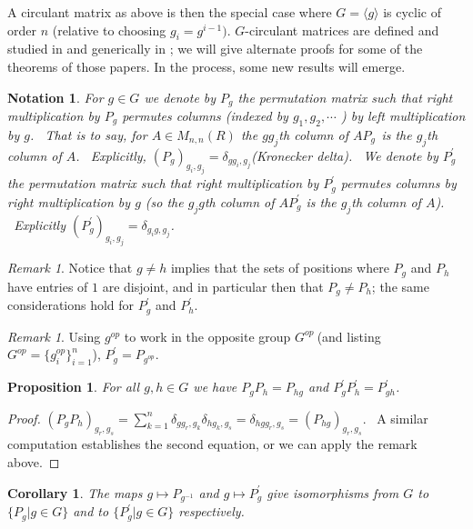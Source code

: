 \documentclass[12pt, a4paper]{amsart}
\numberwithin{equation}{section} %
\theoremstyle{plain}
\theoremstyle{definition}
\theoremstyle{plain}
\newtheorem{prop}[thm]{Proposition}
\newtheorem*{notation}{Notation}
\newtheorem{cor}[thm]{Corollary}
\theoremstyle{remark}
\newtheorem{rem}[thm]{Remark}
\begin{document}
A circulant matrix as above is then the special case where  $G= \langle g \rangle$ is cyclic of order $n$ (relative to choosing $g_{i}=g^{i-1})$.  $G$-circulant
matrices are defined and studied in \cite{hurley2006} and generically in \cite{kanemitsu2013matrices}; we will give alternate proofs for some of the theorems of those papers. In the process, some new results will emerge.

\begin{notation}
For $g\in G$ we denote by $P_{g}$ the permutation matrix such that right
multiplication by $P_{g}$ permutes columns (indexed by $g_{1},g_{2},\cdots $%
) by left multiplication by $g$. \ That is to say, for $A\in M_{n,n}(R)$ the 
$gg_{j}$th column of $AP_{g\text{ }}$is the $g_{j}$th column of $A$. \
Explicitly, $(P_{g})_{g_{i},g_{j}}=\delta _{gg_{i},g_{j}}$(Kronecker delta).
\ We denote by $P_{g}^{\prime }$  the permutation matrix such that right
multiplication by $P_{g}^{\prime }$ permutes columns by \textit{right
multiplication by }$g$ (so the $g_{j}g$th column of $AP_{g}^{\prime }$ is
the $g_{j}$th column of $A$). \ Explicitly $(P_{g}^{\prime
})_{g_{i},g_{j}}=\delta _{g_{i}g,g_{j}}$. \ 
\end{notation}

\begin{rem}
Notice that $g\neq h$ implies that the sets of positions where $P_{g}$ and $%
P_{h}$ have entries of $1$ are disjoint, and in particular then that $%
P_{g}\neq P_{h}$; the same considerations hold for $P_{g}^{\prime }$ and $%
P_{h}^{\prime }$.
\end{rem}

\begin{rem}
Using $g^{op}$ to work in the opposite group $G^{op}~$(and listing $%
G^{op}=\{g_{i}^{op}\}_{i=1}^{n}$), $P_{g}^{\prime }=P_{g^{op}}$.
\end{rem}

\begin{prop}
For all $g,h\in G$ we have $P_{g}P_{h}=P_{hg}$ and $P_{g}^{\prime
}P_{h}^{\prime }=P_{gh}^{\prime }$. 
\end{prop}

\begin{proof}
$(P_{g}P_{h})_{g_{r},g_{s}}=\sum\limits_{k=1}^{n}\delta
_{gg_{r},g_{k}}\delta _{hg_{k},g_{s}}=\delta _{hgg_{r},g_{s}}=\left(
P_{hg}\right) _{g_{r},g_{s}}$. \ A similar computation establishes the
second equation, or we can apply the remark above.
\end{proof}

\begin{cor}
The maps $g\mapsto P_{g^{-1}}$ and $g\mapsto P_{g}^{\prime }$ give
isomorphisms from $G$ to $\{P_{g}|g\in G\}$ and to $\{P_{g}^{\prime }|g\in
G\}$ respectively.
\end{cor}
\end{document}
